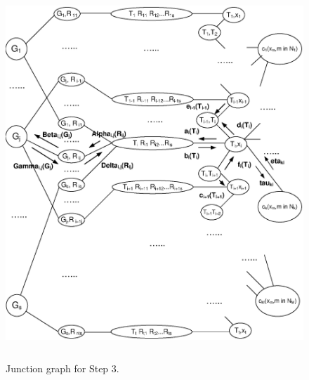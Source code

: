 
\begin{figure}\label{juncfig}
\vspace{0.0in}\hspace{0.0in}\includegraphics[width=5.0in,height=5.5in]{Drawing11new.eps}
\caption{Junction graph for Step 3.}
\end{figure}

